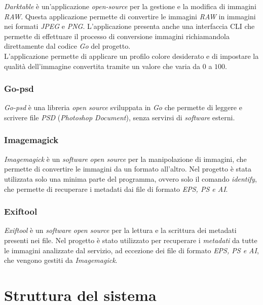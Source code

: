 \emph{Darktable} è un'applicazione \emph{open-source} per la gestione e la
modifica di immagini \emph{RAW}. Questa applicazione permette di convertire le
immagini \emph{RAW} in immagini nei formati \emph{JPEG} e \emph{PNG}.
L'applicazione presenta anche una interfaccia \glsfirstoccur\gls{CLI} che
permette di effettuare il processo di conversione immagini richiamandola
direttamente dal codice \emph{Go} del progetto.\\
L'applicazione permette di applicare un profilo colore desiderato e di impostare
la qualità dell'immagine convertita tramite un valore che varia da $0$ a $100$. \cite{darktable}

\subsubsection*{Go-psd}

\emph{Go-psd} è una libreria \emph{open source} sviluppata in \emph{Go} che
permette di leggere e scrivere file \emph{PSD} (\emph{Photoshop Document}),
senza servirsi di \emph{software} esterni. \cite{go-psd}

\subsubsection*{Imagemagick}

\emph{Imagemagick} è un \emph{software} \emph{open source} per la manipolazione
di immagini, che permette di convertire le immagini da un formato all'altro.
Nel progetto è stata utilizzata solo una minima parte del programma, ovvero
solo il comando \emph{identify}, che permette di recuperare i metadati dai file
di formato \emph{EPS, PS e AI}. \cite{imagemagick}

\subsubsection*{Exiftool}

\emph{Exiftool} è un \emph{software} \emph{open source} per la lettura e la
scrittura dei metadati presenti nei file. Nel progetto è stato utilizzato per
recuperare i \emph{metadati} da tutte le immagini analizzate dal servizio, ad
eccezione dei file di formato \emph{EPS, PS e AI}, che vengono gestiti da
\emph{Imagemagick}.\cite{exiftool}

\section{Struttura del sistema}

